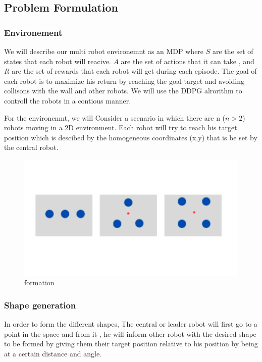 \documentclass[12pt]{extarticle}
\begin{document}
\subsection{Problem Formulation}
 

\subsubsection{Environement}

We will describe our multi robot environemnt as an MDP where $S$ are the set of states that each robot will reacive. $A$ are the set of actions that it can take , and $R$ are the set of rewards that each robot will get during each episode. The  goal of each robot is to  maximize his return by reaching the goal target and avoiding collisons with the wall and other  robots. We will use the DDPG alrorithm to controll the robots in a contious manner.




For the environemnt, we will Consider a scenario in which there are n ($n >  2$) robots moving in a 2D environment. Each robot will try to reach his target position which is descibed by the homogeneous coordinates (x,y)  that is be set by the  central robot.


 
 \begin{figure}[h]  
\centering
\includegraphics[scale=0.4]{formation}
\caption[formation]{formation}
\end{figure}

\pagebreak
\subsubsection{Shape generation}
In order to form the different shapes, The central or leader robot will first go to a point in the space and from it , he will inform  other robot with the desired shape to be formed by giving them their target position relative to his position by being at a certain distance and angle.
\end{document}
